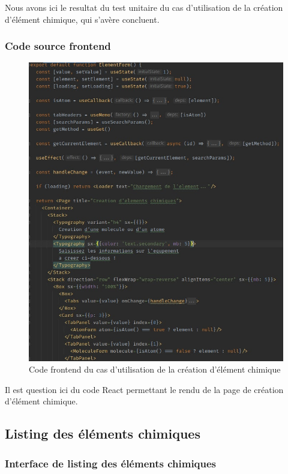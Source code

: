 Nous avons ici le resultat du test unitaire du cas d'utilisation de la création d'élément chimique, qui s'avère concluent.

\subsubsection{Code source frontend}

\begin{figure}[H]
	\centering
	\includegraphics[width=1\textwidth]{img/fec}
	\caption{Code frontend du cas d'utilisation de la création d'élément chimique}
	\label{fig:mesh1}
\end{figure}

Il est question ici du code React permettant le rendu de la page de création d'élément chimique.

\subsection{Listing des éléments chimiques}

\subsubsection{Interface de listing des éléments chimiques}

